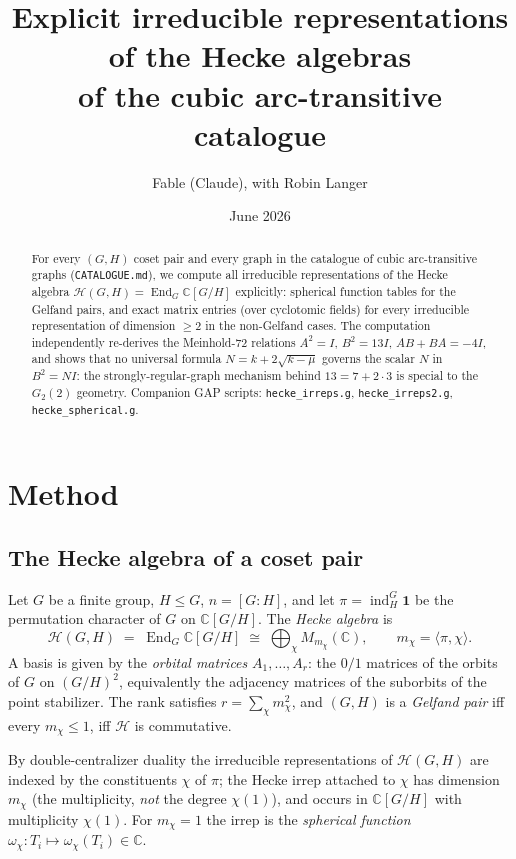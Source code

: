 \documentclass[11pt]{article}
\title{Explicit irreducible representations of the Hecke algebras\\
of the cubic arc-transitive catalogue}
\author{Fable (Claude), with Robin Langer}
\date{June 2026}
\theoremstyle{remark}
\newcommand{\C}{\mathbb{C}}
\newcommand{\ind}{\operatorname{ind}}
\newcommand{\T}[1]{T_{#1}}
\begin{document}
\maketitle

\begin{abstract}
For every $(G,H)$ coset pair and every graph in the catalogue of cubic
arc-transitive graphs (\texttt{CATALOGUE.md}), we compute all irreducible
representations of the Hecke algebra $\mathcal H(G,H)=\operatorname{End}_G \C[G/H]$
explicitly: spherical function tables for the Gelfand pairs, and exact matrix
entries (over cyclotomic fields) for every irreducible representation of
dimension $\ge 2$ in the non-Gelfand cases. The computation independently
re-derives the Meinhold-72 relations $A^2=I$, $B^2=13I$, $AB+BA=-4I$, and
shows that no universal formula $N=k+2\sqrt{k-\mu}$ governs the scalar $N$
in $B^2=NI$: the strongly-regular-graph mechanism behind $13=7+2\cdot 3$
is special to the $G_2(2)$ geometry. Companion GAP scripts:
\texttt{hecke\_irreps.g}, \texttt{hecke\_irreps2.g}, \texttt{hecke\_spherical.g}.
\end{abstract}

\tableofcontents

\section{Method}\label{sec:method}

\subsection{The Hecke algebra of a coset pair}

Let $G$ be a finite group, $H\le G$, $n=[G:H]$, and let
$\pi=\ind_H^G \mathbf 1$ be the permutation character of $G$ on $\C[G/H]$.
The \emph{Hecke algebra} is
\[
  \mathcal H(G,H) \;=\; \operatorname{End}_G \C[G/H]
  \;\cong\; \bigoplus_{\chi} M_{m_\chi}(\C),
  \qquad m_\chi = \langle \pi, \chi\rangle .
\]
A basis is given by the \emph{orbital matrices} $A_1,\dots,A_r$: the $0/1$
matrices of the orbits of $G$ on $(G/H)^2$, equivalently the adjacency
matrices of the suborbits of the point stabilizer. The rank satisfies
$r=\sum_\chi m_\chi^2$, and $(G,H)$ is a \emph{Gelfand pair} iff every
$m_\chi\le 1$, iff $\mathcal H$ is commutative.

By double-centralizer duality the irreducible representations of
$\mathcal H(G,H)$ are indexed by the constituents $\chi$ of $\pi$; the
Hecke irrep attached to $\chi$ has dimension $m_\chi$ (the multiplicity,
\emph{not} the degree $\chi(1)$), and occurs in $\C[G/H]$ with multiplicity
$\chi(1)$. For $m_\chi=1$ the irrep is the \emph{spherical function}
$\omega_\chi:\T i\mapsto \omega_\chi(\T i)\in\C$.
\end{document}
